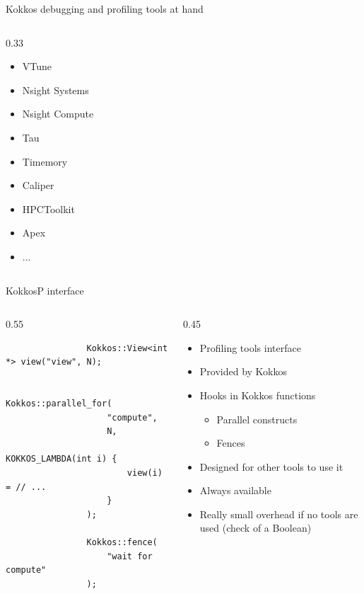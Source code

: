 \documentclass[
    aspectratio=169,
    \createHandout
]{beamer}
\begin{document}
\begin{frame}{Kokkos debugging and profiling tools at hand}
\begin{columns}[T]
\begin{column}{0.33\linewidth}
\begin{itemize}
                \item VTune
                \item Nsight Systems
                \item Nsight Compute
                \item Tau
                \item Timemory
                \item Caliper
                \item HPCToolkit
                \item Apex
                \item ...
            \end{itemize}
        \end{column}
    \end{columns}
\end{frame}

\begin{frame}[fragile]{KokkosP interface}
    \begin{columns}
        \begin{column}{0.55\linewidth}
            \begin{verbatim}
                Kokkos::View<int *> view("view", N);

                Kokkos::parallel_for(
                    "compute",
                    N,
                    KOKKOS_LAMBDA(int i) {
                        view(i) = // ...
                    }
                );

                Kokkos::fence(
                    "wait for compute"
                );
            \end{verbatim}
        \end{column}
        \begin{column}{0.45\linewidth}
            \begin{itemize}
                \item Profiling tools interface
                \item Provided by Kokkos
                \item Hooks in Kokkos functions
                \begin{itemize}
                    \item Parallel constructs
                    \item Fences
                \end{itemize}
                \item Designed for other tools to use it
                \item Always available
                \item Really small overhead if no tools are used (check of a Boolean)
            \end{itemize}
        \end{column}
    \end{columns}
\end{frame}
\end{document}
